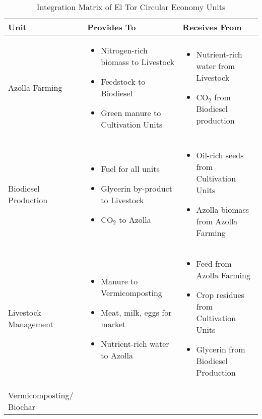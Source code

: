 \begin{table}[h]
\centering
\caption{Integration Matrix of El Tor Circular Economy Units}
\label{tab:integration_matrix}
\begin{tabular}{|p{3cm}|p{5cm}|p{5cm}|}
\hline
\textbf{Unit} & \textbf{Provides To} & \textbf{Receives From} \\
\hline
Azolla Farming & 
\begin{itemize}
    \item Nitrogen-rich biomass to Livestock
    \item Feedstock to Biodiesel
    \item Green manure to Cultivation Units
\end{itemize} & 
\begin{itemize}
    \item Nutrient-rich water from Livestock
    \item CO$_2$ from Biodiesel production
\end{itemize} \\
\hline
Biodiesel Production & 
\begin{itemize}
    \item Fuel for all units
    \item Glycerin by-product to Livestock
    \item CO$_2$ to Azolla
\end{itemize} & 
\begin{itemize}
    \item Oil-rich seeds from Cultivation Units
    \item Azolla biomass from Azolla Farming
\end{itemize} \\
\hline
Livestock Management & 
\begin{itemize}
    \item Manure to Vermicomposting
    \item Meat, milk, eggs for market
    \item Nutrient-rich water to Azolla
\end{itemize} & 
\begin{itemize}
    \item Feed from Azolla Farming
    \item Crop residues from Cultivation Units
    \item Glycerin from Biodiesel Production
\end{itemize} \\
\hline
Vermicomposting/ Biochar & 
\begin{itemize}

\end{itemize}
\end{tabular}
\end{table}
